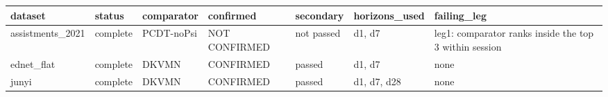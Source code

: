 \begin{tabular}{lllllll}
\toprule
dataset & status & comparator & confirmed & secondary & horizons\_used & failing\_leg \\
\midrule
assistments\_2021 & complete & PCDT-noPsi & NOT CONFIRMED & not passed & d1, d7 & leg1: comparator ranks inside the top 3 within session \\
ednet\_flat & complete & DKVMN & CONFIRMED & passed & d1, d7 & none \\
junyi & complete & DKVMN & CONFIRMED & passed & d1, d7, d28 & none \\
\bottomrule
\end{tabular}
